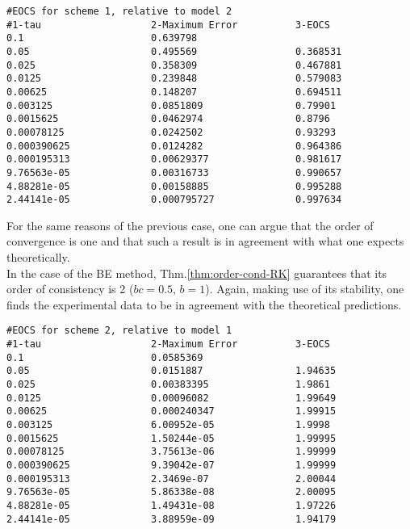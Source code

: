 \documentclass[11pt]{article}
\theoremstyle{theorem}
\theoremstyle{definition}
\begin{document}
\begin{lstlisting}
#EOCS for scheme 1, relative to model 2
#1-tau                   2-Maximum Error          3-EOCS                   
0.1                      0.639798                 	
0.05                     0.495569                 0.368531
0.025                    0.358309                 0.467881
0.0125                   0.239848                 0.579083
0.00625                  0.148207                 0.694511
0.003125                 0.0851809                0.79901
0.0015625                0.0462974                0.8796
0.00078125               0.0242502                0.93293
0.000390625              0.0124282                0.964386
0.000195313              0.00629377               0.981617
9.76563e-05              0.00316733               0.990657
4.88281e-05              0.00158885               0.995288
2.44141e-05              0.000795727              0.997634
\end{lstlisting}

For the same reasons of the previous case, one can argue that the order of convergence is one and that such a result is in agreement with what one expects theoretically.\\

In the case of the BE method, Thm.\ref{thm:order-cond-RK} guarantees that its order of consistency is 2 ($ bc=0.5$, $b=1$). Again, making use of its stability, one finds the experimental data to be in agreement with the theoretical predictions.\\

\begin{lstlisting}
#EOCS for scheme 2, relative to model 1
#1-tau                   2-Maximum Error          3-EOCS                   
0.1                      0.0585369                	
0.05                     0.0151887                1.94635
0.025                    0.00383395               1.9861
0.0125                   0.00096082               1.99649
0.00625                  0.000240347              1.99915
0.003125                 6.00952e-05              1.9998
0.0015625                1.50244e-05              1.99995
0.00078125               3.75613e-06              1.99999
0.000390625              9.39042e-07              1.99999
0.000195313              2.3469e-07               2.00044
9.76563e-05              5.86338e-08              2.00095
4.88281e-05              1.49431e-08              1.97226
2.44141e-05              3.88959e-09              1.94179
\end{lstlisting}
\end{document}
